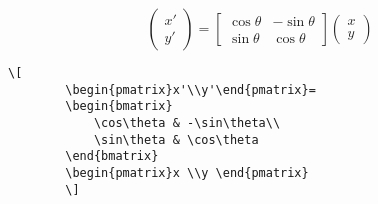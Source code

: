 \begin{itemize}
    \[ \begin{pmatrix}x'\\y'\end{pmatrix}=
    \begin{bmatrix}
        \cos\theta & -\sin\theta\\
        \sin\theta & \cos\theta
    \end{bmatrix}
    \begin{pmatrix}x \\y \end{pmatrix} \]

    \begin{lstlisting}[language = Tex, numbers = none]
        \[ 
        \begin{pmatrix}x'\\y'\end{pmatrix}=
        \begin{bmatrix}
            \cos\theta & -\sin\theta\\
            \sin\theta & \cos\theta
        \end{bmatrix}
        \begin{pmatrix}x \\y \end{pmatrix} 
        \]
    \end{lstlisting}



\end{itemize}
